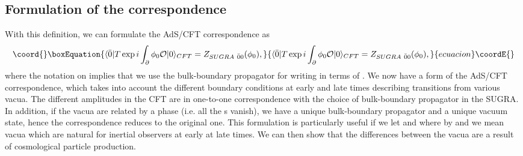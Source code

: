 \documentclass[a4paper,aps,prd,preprintnumbers,groupedaddress]{revtex4}
\begin{document}
\subsection{Formulation of the correspondence}
With this definition, we can formulate the AdS/CFT correspondence as
\begin{equation}\coord{}\boxEquation{ \label{ads cft}
\langle \bar{0} | T \exp i \int_\partial \phi_0 {\cal O} | 0 \rangle_{CFT} = Z_{SUGRA \ \bar{0} 0} (\phi_0) ,
}{ \langle \bar{0} | T \exp i \int_\partial \phi_0 {\cal O} | 0 \rangle_{CFT} = Z_{SUGRA \ \bar{0} 0} (\phi_0) ,
}{ecuacion}\coordE{}\end{equation}
where the notation on \coordHE{} implies that we use the \coordHE{} bulk-boundary propagator for writing \myHighlight{$\phi$}\coordHE{} in terms of \coordHE{}. We now have a
form of the AdS/CFT correspondence, which takes into account the different boundary conditions at early and late times describing
transitions from various vacua.    The different amplitudes in the CFT are in one-to-one correspondence with the choice of
bulk-boundary propagator in the SUGRA.   In addition, if the vacua are related by a phase (i.e. all the \myHighlight{$\beta$}\coordHE{}s vanish), we have a unique
bulk-boundary propagator and a unique vacuum state, hence the correspondence reduces to the original one. This formulation is particularly
useful if we let \coordHE{}  and \coordHE{} where by \coordHE{} and \coordHE{} we mean vacua which are natural for inertial observers
at early at late times.
We can then show that the differences between the vacua are
a result of cosmological particle production.
\end{document}
